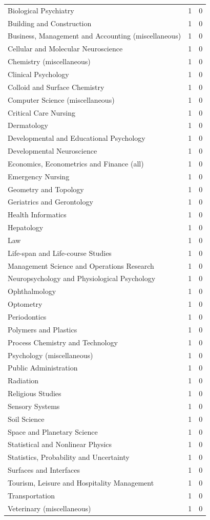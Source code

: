 \documentclass[12pt,brazil]{article}\usepackage[]{graphicx}\usepackage[]{xcolor}
\begin{document}
\begin{longtable}{lrr}
Biological Psychiatry & 1 & 0 \\
Building and Construction & 1 & 0 \\
Business, Management and Accounting (miscellaneous) & 1 & 0 \\
Cellular and Molecular Neuroscience & 1 & 0 \\
Chemistry (miscellaneous) & 1 & 0 \\
Clinical Psychology & 1 & 0 \\
Colloid and Surface Chemistry & 1 & 0 \\
Computer Science (miscellaneous) & 1 & 0 \\
Critical Care Nursing & 1 & 0 \\
Dermatology & 1 & 0 \\
Developmental and Educational Psychology & 1 & 0 \\
Developmental Neuroscience & 1 & 0 \\
Economics, Econometrics and Finance (all) & 1 & 0 \\
Emergency Nursing & 1 & 0 \\
Geometry and Topology & 1 & 0 \\
Geriatrics and Gerontology & 1 & 0 \\
Health Informatics & 1 & 0 \\
Hepatology & 1 & 0 \\
Law & 1 & 0 \\
Life-span and Life-course Studies & 1 & 0 \\
Management Science and Operations Research & 1 & 0 \\
Neuropsychology and Physiological Psychology & 1 & 0 \\
Ophthalmology & 1 & 0 \\
Optometry & 1 & 0 \\
Periodontics & 1 & 0 \\
Polymers and Plastics & 1 & 0 \\
Process Chemistry and Technology & 1 & 0 \\
Psychology (miscellaneous) & 1 & 0 \\
Public Administration & 1 & 0 \\
Radiation & 1 & 0 \\
Religious Studies & 1 & 0 \\
Sensory Systems & 1 & 0 \\
Soil Science & 1 & 0 \\
Space and Planetary Science & 1 & 0 \\
Statistical and Nonlinear Physics & 1 & 0 \\
Statistics, Probability and Uncertainty & 1 & 0 \\
Surfaces and Interfaces & 1 & 0 \\
Tourism, Leisure and Hospitality Management & 1 & 0 \\
Transportation & 1 & 0 \\
Veterinary (miscellaneous) & 1 & 0 \\
\end{longtable}
\end{document}
